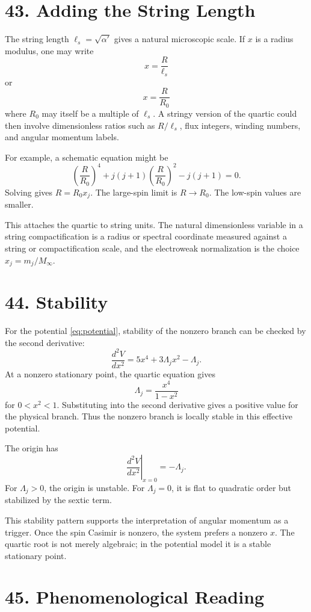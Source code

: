 \documentclass[11pt]{article}
\newcommand{\Lspin}{\Lambda_j}
\begin{document}
\section*{43. Adding the String Length}

The string length \(\ell_s=\sqrt{\alpha'}\) gives a natural microscopic scale. If \(x\) is a radius modulus, one may write
\[
        x=\frac{R}{\ell_s}
\]
or
\[
        x=\frac{R}{R_0}
\]
where \(R_0\) may itself be a multiple of \(\ell_s\). A stringy version of the quartic could then involve dimensionless ratios such as \(R/\ell_s\), flux integers, winding numbers, and angular momentum labels.

For example, a schematic equation might be
\[
        \left(\frac{R}{R_0}\right)^4
        +
        j(j+1)
        \left(\frac{R}{R_0}\right)^2
        -
        j(j+1)
        =0 .
\]
Solving gives \(R=R_0x_j\). The large-spin limit is \(R\to R_0\). The low-spin values are smaller.

This attaches the quartic to string units. The natural dimensionless variable in a string compactification is a radius or spectral coordinate measured against a string or compactification scale, and the electroweak normalization is the choice \(x_j=m_j/M_\infty\).


\section*{44. Stability}

For the potential \eqref{eq:potential}, stability of the nonzero branch can be checked by the second derivative:
\[
        \frac{d^2V}{dx^2}
        =
        5x^4+3\Lspin x^2-\Lspin .
\]
At a nonzero stationary point, the quartic equation gives
\[
        \Lspin=\frac{x^4}{1-x^2}
\]
for \(0<x^2<1\). Substituting into the second derivative gives a positive value for the physical branch. Thus the nonzero branch is locally stable in this effective potential.

The origin has
\[
        \left.\frac{d^2V}{dx^2}\right|_{x=0}=-\Lspin .
\]
For \(\Lspin>0\), the origin is unstable. For \(\Lspin=0\), it is flat to quadratic order but stabilized by the sextic term.

This stability pattern supports the interpretation of angular momentum as a trigger. Once the spin Casimir is nonzero, the system prefers a nonzero \(x\). The quartic root is not merely algebraic; in the potential model it is a stable stationary point.


\section*{45. Phenomenological Reading}
\end{document}

